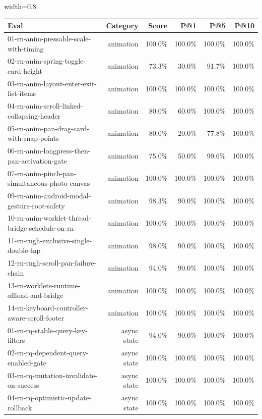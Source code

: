 \begin{table}[htbp]
\centering
\begin{adjustbox}{width=0.8\textwidth}
\begin{tabular}{lrrrrr}
\toprule
Eval & Category & Score & P@1 & P@5 & P@10 \\
\midrule
01-rn-anim-pressable-scale-with-timing & animation & 100.0\% & 100.0\% & 100.0\% & 100.0\% \\
02-rn-anim-spring-toggle-card-height & animation & 73.3\% & 30.0\% & 91.7\% & 100.0\% \\
03-rn-anim-layout-enter-exit-list-items & animation & 100.0\% & 100.0\% & 100.0\% & 100.0\% \\
04-rn-anim-scroll-linked-collapsing-header & animation & 80.0\% & 60.0\% & 100.0\% & 100.0\% \\
05-rn-anim-pan-drag-card-with-snap-points & animation & 80.0\% & 20.0\% & 77.8\% & 100.0\% \\
06-rn-anim-longpress-then-pan-activation-gate & animation & 75.0\% & 50.0\% & 99.6\% & 100.0\% \\
07-rn-anim-pinch-pan-simultaneous-photo-canvas & animation & 100.0\% & 100.0\% & 100.0\% & 100.0\% \\
09-rn-anim-android-modal-gesture-root-safety & animation & 98.3\% & 90.0\% & 100.0\% & 100.0\% \\
10-rn-anim-worklet-thread-bridge-schedule-on-rn & animation & 100.0\% & 100.0\% & 100.0\% & 100.0\% \\
11-rn-rngh-exclusive-single-double-tap & animation & 98.0\% & 90.0\% & 100.0\% & 100.0\% \\
12-rn-rngh-scroll-pan-failure-chain & animation & 94.0\% & 90.0\% & 100.0\% & 100.0\% \\
13-rn-worklets-runtime-offload-and-bridge & animation & 100.0\% & 100.0\% & 100.0\% & 100.0\% \\
14-rn-keyboard-controller-aware-scroll-footer & animation & 100.0\% & 100.0\% & 100.0\% & 100.0\% \\
01-rn-rq-stable-query-key-filters & async state & 94.0\% & 90.0\% & 100.0\% & 100.0\% \\
02-rn-rq-dependent-query-enabled-gate & async state & 100.0\% & 100.0\% & 100.0\% & 100.0\% \\
03-rn-rq-mutation-invalidate-on-success & async state & 100.0\% & 100.0\% & 100.0\% & 100.0\% \\
04-rn-rq-optimistic-update-rollback & async state & 100.0\% & 100.0\% & 100.0\% & 100.0\% \\

\end{tabular}
\end{adjustbox}
\end{table}
